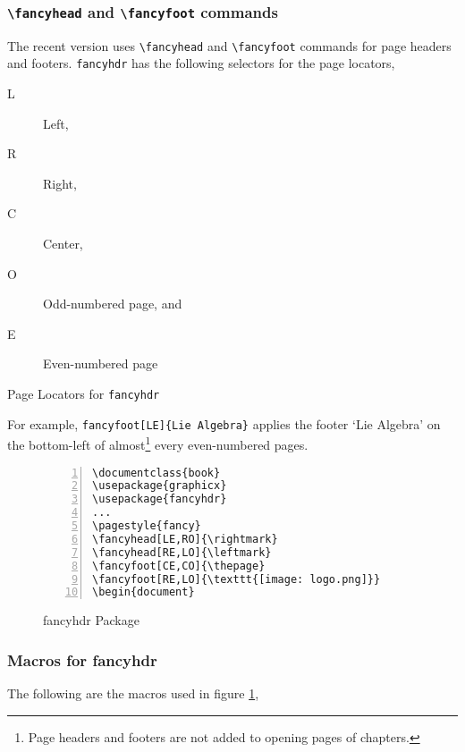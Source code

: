\documentclass{article}
\begin{document}
\subsubsection{\texttt{\textbackslash fancyhead} and \texttt{\textbackslash fancyfoot} commands}
	The recent version uses \texttt{\textbackslash fancyhead} and \texttt{\textbackslash fancyfoot} commands for page headers and footers. \texttt{fancyhdr} has the following selectors for the page locators,
\begin{table}[h]
\centering
\begin{minipage}{0.45\textwidth}
\begin{description} 
	\item[L] Left,
	\item[R] Right,
	\item[C] Center,
\end{description}
\end{minipage}
\begin{minipage}{0.45\textwidth}
\begin{description} 
	\item[O] Odd-numbered page, and
	\item[E] Even-numbered page
\end{description}
\end{minipage}
\caption{Page Locators for \texttt{fancyhdr}}
\end{table}

	For example, \texttt{fancyfoot[LE]\{Lie Algebra\}} applies the footer `Lie Algebra' on the bottom-left of almost\footnote{Page headers and footers are not added to opening pages of chapters.} every even-numbered pages.

\begin{figure}[h]
\centering
\begin{Verbatim}[numbers = left]
\documentclass{book}
\usepackage{graphicx}
\usepackage{fancyhdr}
...
\pagestyle{fancy}
\fancyhead[LE,RO]{\rightmark}
\fancyhead[RE,LO]{\leftmark}
\fancyfoot[CE,CO]{\thepage}
\fancyfoot[RE,LO]{\texttt{[image: logo.png]}}
\begin{document}
\end{Verbatim}
\caption{fancyhdr Package}
\label{fig:fancyhdr}
\end{figure}

\subsubsection{Macros for fancyhdr}
The following are the macros used in figure \ref{fig:fancyhdr},
\end{document}
